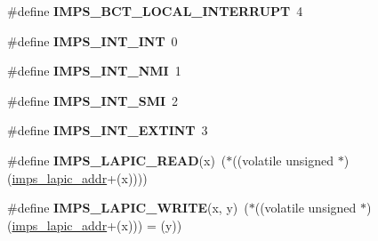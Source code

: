 \begin{DoxyCompactItemize}
\mbox{\label{smp-imps_8h_ae5345cbda90a3e35ee6f8b72ff04d492}} 
\#define {\bfseries I\+M\+P\+S\+\_\+\+B\+C\+T\+\_\+\+L\+O\+C\+A\+L\+\_\+\+I\+N\+T\+E\+R\+R\+U\+PT}~4
\item 
\mbox{\label{smp-imps_8h_a74424ba93941ff3e5aba155459d57fb8}} 
\#define {\bfseries I\+M\+P\+S\+\_\+\+I\+N\+T\+\_\+\+I\+NT}~0
\item 
\mbox{\label{smp-imps_8h_a6e027f0da6052e82d8e41473616f5bae}} 
\#define {\bfseries I\+M\+P\+S\+\_\+\+I\+N\+T\+\_\+\+N\+MI}~1
\item 
\mbox{\label{smp-imps_8h_ad256d897871fc3bf34bcc574964a6cb4}} 
\#define {\bfseries I\+M\+P\+S\+\_\+\+I\+N\+T\+\_\+\+S\+MI}~2
\item 
\mbox{\label{smp-imps_8h_ae59dcdfb4760e6d48f75868e3a441f6f}} 
\#define {\bfseries I\+M\+P\+S\+\_\+\+I\+N\+T\+\_\+\+E\+X\+T\+I\+NT}~3
\item 
\mbox{\label{smp-imps_8h_a8ec4693b52c0061eebb180de9218484c}} 
\#define {\bfseries I\+M\+P\+S\+\_\+\+L\+A\+P\+I\+C\+\_\+\+R\+E\+AD}(x)~($\ast$((volatile unsigned $\ast$) (\mbox{\hyperlink{smp-imps_8h_ad8c4ff22d3eb7322acff621557229f55}{imps\+\_\+lapic\+\_\+addr}}+(x))))
\item 
\mbox{\label{smp-imps_8h_a070607784819fa2f8beca9b8cdb3f8ce}} 
\#define {\bfseries I\+M\+P\+S\+\_\+\+L\+A\+P\+I\+C\+\_\+\+W\+R\+I\+TE}(x,  y)~($\ast$((volatile unsigned $\ast$) (\mbox{\hyperlink{smp-imps_8h_ad8c4ff22d3eb7322acff621557229f55}{imps\+\_\+lapic\+\_\+addr}}+(x))) = (y))
\end{DoxyCompactItemize}
